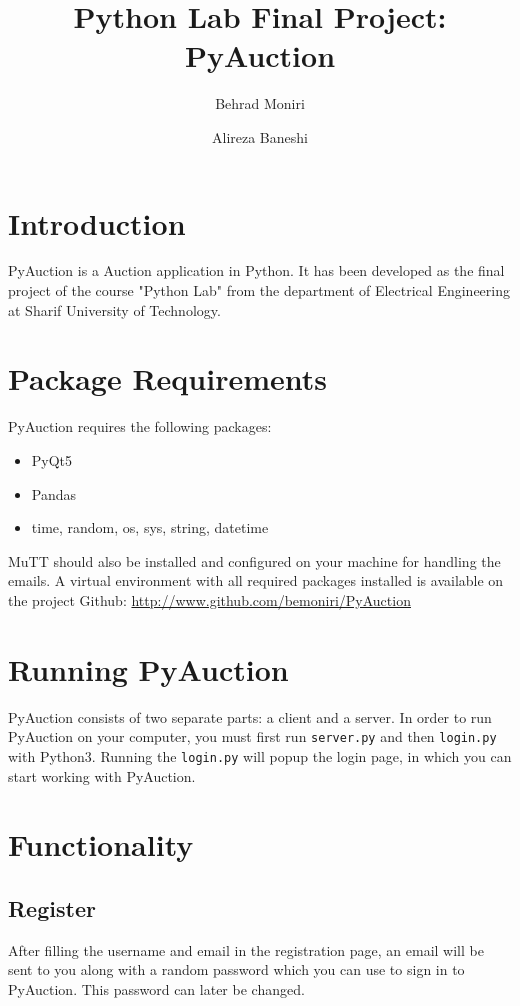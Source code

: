\documentclass{article}
\title {Python Lab Final Project: PyAuction}
\author{Behrad Moniri \and Alireza Baneshi}
\begin{document}
\maketitle
\section{Introduction}

PyAuction is a Auction application in Python. It has been developed as the final project of the course "Python Lab" from the department of Electrical Engineering at Sharif University of Technology.

\section{Package Requirements}
PyAuction requires the following packages:

\begin{itemize}
	\item PyQt5
	\item Pandas
	\item time, random, os, sys, string, datetime
\end{itemize}
MuTT should also be installed and configured on your machine for handling the emails. A virtual environment with all required packages installed is available on the project Github:
\url{http://www.github.com/bemoniri/PyAuction}

\section{Running PyAuction}

PyAuction consists of two separate parts: a client and a server. In order to run PyAuction on your computer, you must first run \texttt{server.py} and then \texttt{login.py} with Python3. Running the \texttt{login.py} will popup the login page, in which you can start working with PyAuction.

\section{Functionality}
\subsection{Register}
After filling the username and email in the registration page, an email will be sent to you along with a random password which you can use to sign in to PyAuction. This password can later be changed.
\end{document}
